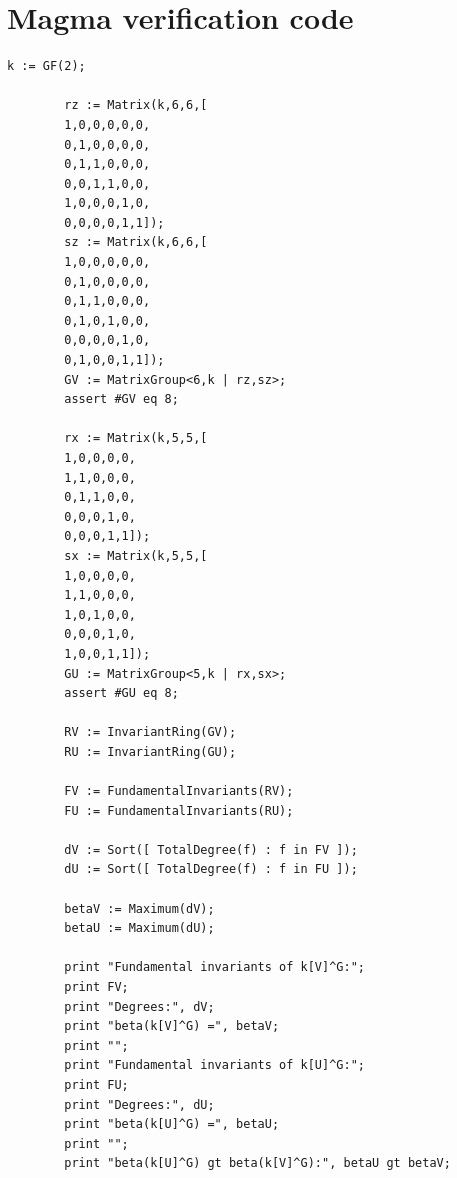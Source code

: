 \documentclass[11pt]{article}
\theoremstyle{definition}
\begin{document}
	\appendix
	\section{Magma verification code}\label{app:magma}
	
	\begin{lstlisting}[basicstyle=\ttfamily\footnotesize,breaklines=true,frame=single]
		k := GF(2);
		
		rz := Matrix(k,6,6,[
		1,0,0,0,0,0,
		0,1,0,0,0,0,
		0,1,1,0,0,0,
		0,0,1,1,0,0,
		1,0,0,0,1,0,
		0,0,0,0,1,1]);
		sz := Matrix(k,6,6,[
		1,0,0,0,0,0,
		0,1,0,0,0,0,
		0,1,1,0,0,0,
		0,1,0,1,0,0,
		0,0,0,0,1,0,
		0,1,0,0,1,1]);
		GV := MatrixGroup<6,k | rz,sz>;
		assert #GV eq 8;
		
		rx := Matrix(k,5,5,[
		1,0,0,0,0,
		1,1,0,0,0,
		0,1,1,0,0,
		0,0,0,1,0,
		0,0,0,1,1]);
		sx := Matrix(k,5,5,[
		1,0,0,0,0,
		1,1,0,0,0,
		1,0,1,0,0,
		0,0,0,1,0,
		1,0,0,1,1]);
		GU := MatrixGroup<5,k | rx,sx>;
		assert #GU eq 8;
		
		RV := InvariantRing(GV);
		RU := InvariantRing(GU);
		
		FV := FundamentalInvariants(RV);
		FU := FundamentalInvariants(RU);
		
		dV := Sort([ TotalDegree(f) : f in FV ]);
		dU := Sort([ TotalDegree(f) : f in FU ]);
		
		betaV := Maximum(dV);
		betaU := Maximum(dU);
		
		print "Fundamental invariants of k[V]^G:";
		print FV;
		print "Degrees:", dV;
		print "beta(k[V]^G) =", betaV;
		print "";
		print "Fundamental invariants of k[U]^G:";
		print FU;
		print "Degrees:", dU;
		print "beta(k[U]^G) =", betaU;
		print "";
		print "beta(k[U]^G) gt beta(k[V]^G):", betaU gt betaV;
	\end{lstlisting}
	
\end{document}
